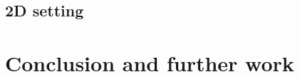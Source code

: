 \documentclass[a4paper]{article}
\begin{document}

\subsection{2D setting} %
\label{sub:2d_setting}



\section{Conclusion and further work} %
\label{sec:conclusion_and_further_work}

\end{document}
